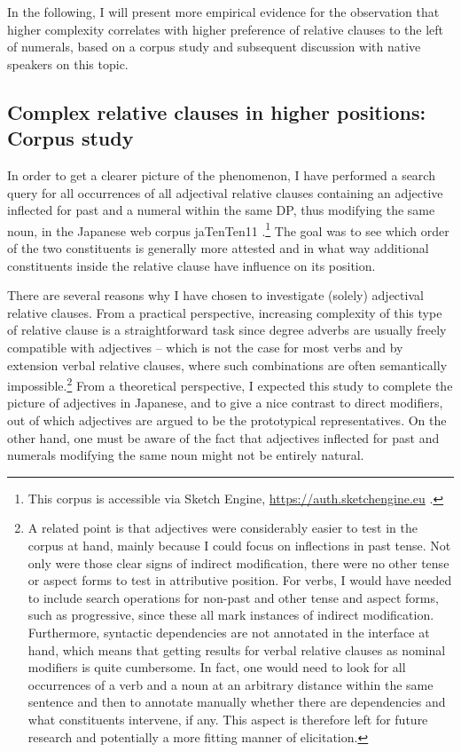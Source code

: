 In the following, I will present more empirical evidence for the observation that higher complexity correlates with higher preference of relative clauses to the left of numerals, based on a corpus study and subsequent discussion with native speakers on this topic.

\subsection{Complex relative clauses in higher positions: Corpus study} \label{section corpus study}

In order to get a clearer picture of the phenomenon, I have performed a search query for all occurrences of all adjectival relative clauses containing an adjective inflected for past and a numeral within the same DP, thus modifying the same noun, in the Japanese web corpus jaTenTen11 \citep{jakubi:2013:ten}.\footnote{This corpus is accessible via Sketch Engine, \url{https://auth.sketchengine.eu} \citep{kilgarriff:2014:sketch}.} The goal was to see which order of the two constituents is generally more attested and in what way additional constituents inside the relative clause have influence on its position. 

There are several reasons why I have chosen to investigate (solely) adjectival relative clauses. From a practical perspective, increasing complexity of this type of relative clause is a straightforward task since degree adverbs are usually freely compatible with adjectives -- which is not the case for most verbs and by extension verbal relative clauses, where such combinations are often semantically impossible.\footnote{A related point is that adjectives were considerably easier to test in the corpus at hand, mainly because I could focus on inflections in past tense. Not only were those clear signs of indirect modification, there were no other tense or aspect forms to test in attributive position. For verbs, I would have needed to include search operations for non-past and other tense and aspect forms, such as progressive, since these all mark instances of indirect modification. Furthermore, syntactic dependencies are not annotated in the interface at hand, which means that getting results for verbal relative clauses as nominal modifiers is quite cumbersome. In fact, one would need to look for all occurrences of a verb and a noun at an arbitrary distance within the same sentence and then to annotate manually whether there are dependencies and what constituents intervene, if any. This aspect is therefore left for future research and potentially a more fitting manner of elicitation.} From a theoretical perspective, I expected this study to complete the picture of adjectives in Japanese, and to give a nice contrast to direct modifiers, out of which adjectives are argued to be the prototypical representatives. On the other hand, one must be aware of the fact that adjectives inflected for past and numerals modifying the same noun might not be entirely natural.  

